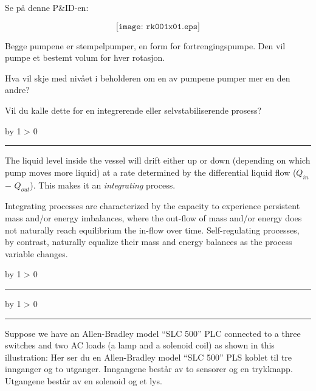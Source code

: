 \documentclass[12pt,a4paper]{article}
\def\oppgave{
            \advance\questnum by 1
            \ifnum \questnum > 0
                 \hrule
                 \vskip 3pt
                 \leftline{Oppgave \the\questnum}
                 \vskip 3pt \fi}
\def\svar{
           \advance\answnum by 1
           \ifnum \answnum > 0
                \hrule
                \vskip 3pt
                \leftline{Svar \the\answnum}
                \vskip 3pt \fi}
\def\notes{
           \advance\explnum by 1
           \ifnum \explnum > 0
                \hrule
                \vskip 3pt
                \leftline{Notes \the\explnum}
                \vskip 3pt \fi}
\begin{document}
Se på denne P\&ID-en:

$$\texttt{[image: rk001x01.eps]}$$

Begge pumpene er stempelpumper, en form for fortrengingspumpe. Den vil pumpe et bestemt volum for hver rotasjon. 

Hva vil skje med nivået i beholderen om en av pumpene  pumper mer en den andre?
 
\vskip 10pt

Vil du kalle dette for en integrerende eller selvstabiliserende prosess?

\vskip 10pt \filbreak 





\svar{} 

The liquid level inside the vessel will drift either up or down (depending on which pump moves more liquid) at a rate determined by the differential liquid flow ($Q_{in}$ $-$ $Q_{out}$).  This makes it an {\it integrating} process.

\vskip 10pt

Integrating processes are characterized by the capacity to experience persistent mass and/or energy imbalances, where the out-flow of mass and/or energy does not naturally reach equilibrium the in-flow over time.  Self-regulating processes, by contrast, naturally equalize their mass and energy balances as the process variable changes.

\vskip 10pt \filbreak 





\notes{} 



\vfil \eject 



\oppgave{} 

Suppose we have an Allen-Bradley model ``SLC 500'' PLC connected to a three switches and two AC loads (a lamp and a solenoid coil) as shown in this illustration:
Her ser du en Allen-Bradley model ``SLC 500'' PLS koblet til tre innganger og to utganger. Inngangene består av to sensorer og en trykknapp. Utgangene består av en solenoid og et lys. 
\end{document}
